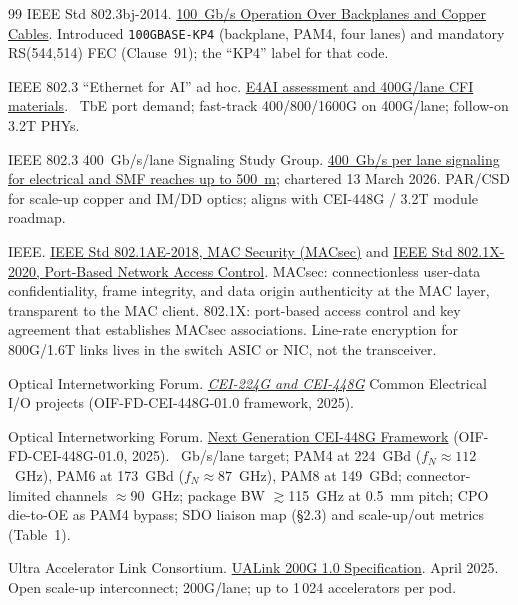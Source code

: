 \begin{thebibliography}{99}
IEEE Std 802.3bj-2014.
\newblock \href{https://standards.ieee.org/standard/802_3bj-2014.html}{100~Gb/s Operation Over Backplanes and Copper Cables}.
\newblock Introduced \texttt{100GBASE-KP4} (backplane, PAM4, four lanes) and mandatory
RS(544,514) FEC (Clause~91); the ``KP4'' label for that code.

IEEE 802.3 ``Ethernet for AI'' ad hoc.
\newblock \href{https://www.ieee802.org/3/ad_hoc/E4AI/}{E4AI assessment and 400G/lane CFI materials}.
~TbE port demand; fast-track 400/800/1600G on 400G/lane; follow-on
3.2T PHYs.

IEEE 802.3 400~Gb/s/lane Signaling Study Group.
\newblock \href{https://www.ieee802.org/3/400GPL/}{400~Gb/s per lane signaling for electrical and SMF
reaches up to 500~m}; chartered 13 March 2026.
\newblock PAR/CSD for scale-up copper and IM/DD optics; aligns with CEI-448G /
3.2T module roadmap.

IEEE.
\newblock \href{https://standards.ieee.org/ieee/802.1AE/7154}{IEEE Std 802.1AE-2018, MAC Security (MACsec)}
and \href{https://standards.ieee.org/ieee/802.1X/12247}{IEEE Std 802.1X-2020, Port-Based Network Access Control}.
\newblock MACsec: connectionless user-data confidentiality, frame integrity, and
data origin authenticity at the MAC layer, transparent to the MAC client. 802.1X:
port-based access control and key agreement that establishes MACsec associations.
Line-rate encryption for 800G/1.6T links lives in the switch ASIC or NIC, not the
transceiver.

Optical Internetworking Forum.
\newblock \emph{\href{https://www.oiforum.com/technical-work/hot-topics/common-electrical-i-o-cei-224g/}{CEI-224G and CEI-448G}} Common Electrical I/O projects
(OIF-FD-CEI-448G-01.0 framework, 2025).

Optical Internetworking Forum.
\newblock \href{https://www.oiforum.com/wp-content/uploads/OIF-FD-CEI-448G-01.0.pdf}{Next Generation CEI-448G Framework}
(OIF-FD-CEI-448G-01.0, 2025).
~Gb/s/lane target; PAM4 at 224~GBd ($f_N\approx112$~GHz), PAM6 at
173~GBd ($f_N\approx87$~GHz), PAM8 at 149~GBd; connector-limited channels
$\approx$90~GHz; package BW $\gtrsim$115~GHz at 0.5~mm pitch; CPO die-to-OE as
PAM4 bypass; SDO liaison map (\S2.3) and scale-up/out metrics (Table~1).

Ultra Accelerator Link Consortium.
\newblock \href{https://ualinkconsortium.org/specifications/}{UALink 200G 1.0 Specification}.
\newblock April 2025.
\newblock Open scale-up interconnect; 200G/lane; up to 1\,024 accelerators per pod.


\end{thebibliography}
